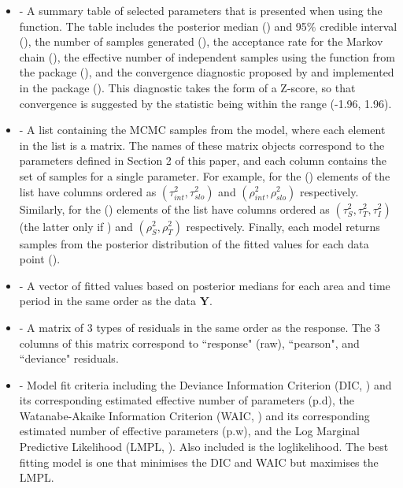 \documentclass[article, nojss]{jss}
\begin{document}
\begin{itemize}
\item {} - A summary table of selected parameters that is presented when using the  function. The table includes the posterior median () and 95$\%$ credible interval (), the number of samples generated (), the acceptance rate for the Markov chain (), the effective number of independent samples using the   function from the  package (), and the convergence  diagnostic proposed by \cite{geweke1992} and implemented in the  package (). This diagnostic takes the form of a Z-score, so that convergence is suggested by the statistic being within the range (-1.96, 1.96).

\item {} - A list containing the MCMC samples from the model, where each element in the list is a matrix. The names of these matrix objects correspond to the parameters defined in Section 2 of this paper, and each column contains the set of samples for a single parameter.  For example, for  the () elements of the list have columns ordered as $(\tau^2_{int}, \tau^2_{slo})$ and $(\rho^2_{int}, \rho^2_{slo})$ respectively. Similarly, for   the () elements of the list have columns ordered as $(\tau^2_{S}, \tau^2_{T}, \tau^2_{I})$ (the latter only if ) and $(\rho^2_{S}, \rho^2_{T})$ respectively. Finally, each model returns samples from the posterior distribution of the fitted values for each data point ().

\item {} - A vector of fitted values based on posterior medians for each area and time period in the same order as the data $\mathbf{Y}$.

\item {} - A matrix of 3 types of residuals in the same order as the response. The 3 columns of this matrix correspond to ``response" (raw), ``pearson", and ``deviance" residuals.

\item {} - Model fit criteria including the Deviance Information Criterion (DIC, \citealp{spiegelhalter2002}) and its corresponding estimated effective number of parameters (p.d), the Watanabe-Akaike Information Criterion (WAIC, \citealp{watanabe2010}) and its corresponding estimated number of effective parameters (p.w), and the Log Marginal Predictive Likelihood (LMPL, \citealp{congdon2005}). Also included is the loglikelihood. The best fitting model is one that minimises the DIC and WAIC but maximises the LMPL.


\end{itemize}
\end{document}
